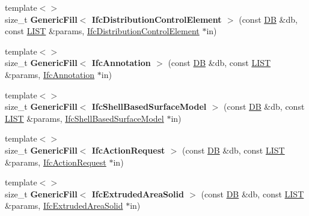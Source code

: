 \begin{DoxyCompactItemize}
\item 
\hypertarget{namespace_assimp_1_1_s_t_e_p_ab11dc7b3fc3b3fd66745750f63e74a9b}{{\footnotesize template$<$$>$ }\\size\+\_\+t {\bfseries Generic\+Fill$<$ Ifc\+Distribution\+Control\+Element $>$} (const \hyperlink{class_assimp_1_1_s_t_e_p_1_1_d_b}{D\+B} \&db, const \hyperlink{class_assimp_1_1_s_t_e_p_1_1_e_x_p_r_e_s_s_1_1_l_i_s_t}{L\+I\+S\+T} \&params, \hyperlink{struct_assimp_1_1_i_f_c_1_1_ifc_distribution_control_element}{Ifc\+Distribution\+Control\+Element} $\ast$in)}\label{namespace_assimp_1_1_s_t_e_p_ab11dc7b3fc3b3fd66745750f63e74a9b}

\item 
\hypertarget{namespace_assimp_1_1_s_t_e_p_a65e2bb2e5344f005fb399f94fdee0870}{{\footnotesize template$<$$>$ }\\size\+\_\+t {\bfseries Generic\+Fill$<$ Ifc\+Annotation $>$} (const \hyperlink{class_assimp_1_1_s_t_e_p_1_1_d_b}{D\+B} \&db, const \hyperlink{class_assimp_1_1_s_t_e_p_1_1_e_x_p_r_e_s_s_1_1_l_i_s_t}{L\+I\+S\+T} \&params, \hyperlink{struct_assimp_1_1_i_f_c_1_1_ifc_annotation}{Ifc\+Annotation} $\ast$in)}\label{namespace_assimp_1_1_s_t_e_p_a65e2bb2e5344f005fb399f94fdee0870}

\item 
\hypertarget{namespace_assimp_1_1_s_t_e_p_ae57a86c1c28a42ce60f16fae60c071c5}{{\footnotesize template$<$$>$ }\\size\+\_\+t {\bfseries Generic\+Fill$<$ Ifc\+Shell\+Based\+Surface\+Model $>$} (const \hyperlink{class_assimp_1_1_s_t_e_p_1_1_d_b}{D\+B} \&db, const \hyperlink{class_assimp_1_1_s_t_e_p_1_1_e_x_p_r_e_s_s_1_1_l_i_s_t}{L\+I\+S\+T} \&params, \hyperlink{struct_assimp_1_1_i_f_c_1_1_ifc_shell_based_surface_model}{Ifc\+Shell\+Based\+Surface\+Model} $\ast$in)}\label{namespace_assimp_1_1_s_t_e_p_ae57a86c1c28a42ce60f16fae60c071c5}

\item 
\hypertarget{namespace_assimp_1_1_s_t_e_p_a0ab0e992fc79ba08d91a9a785f24dfa6}{{\footnotesize template$<$$>$ }\\size\+\_\+t {\bfseries Generic\+Fill$<$ Ifc\+Action\+Request $>$} (const \hyperlink{class_assimp_1_1_s_t_e_p_1_1_d_b}{D\+B} \&db, const \hyperlink{class_assimp_1_1_s_t_e_p_1_1_e_x_p_r_e_s_s_1_1_l_i_s_t}{L\+I\+S\+T} \&params, \hyperlink{struct_assimp_1_1_i_f_c_1_1_ifc_action_request}{Ifc\+Action\+Request} $\ast$in)}\label{namespace_assimp_1_1_s_t_e_p_a0ab0e992fc79ba08d91a9a785f24dfa6}

\item 
\hypertarget{namespace_assimp_1_1_s_t_e_p_ae2efcddb4c762e3375bebb2ab4410e2a}{{\footnotesize template$<$$>$ }\\size\+\_\+t {\bfseries Generic\+Fill$<$ Ifc\+Extruded\+Area\+Solid $>$} (const \hyperlink{class_assimp_1_1_s_t_e_p_1_1_d_b}{D\+B} \&db, const \hyperlink{class_assimp_1_1_s_t_e_p_1_1_e_x_p_r_e_s_s_1_1_l_i_s_t}{L\+I\+S\+T} \&params, \hyperlink{struct_assimp_1_1_i_f_c_1_1_ifc_extruded_area_solid}{Ifc\+Extruded\+Area\+Solid} $\ast$in)}\label{namespace_assimp_1_1_s_t_e_p_ae2efcddb4c762e3375bebb2ab4410e2a}


\end{DoxyCompactItemize}
